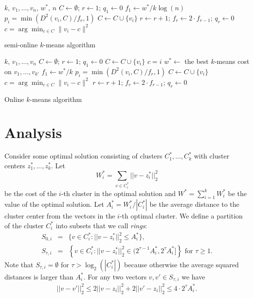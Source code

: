 \documentclass{article}
\def\tab{\hspace{5mm}}
\begin{document}
\begin{algorithm}
\begin{algorithmic}
 $k$, $v_1,\ldots,v_n$, $w^*$, $n$
\STATE $C \gets \emptyset$;\;\; $r \gets 1$;\;\; $q_1 \gets 0$ 
\STATE $f_1 \gets w^*/k\log(n)$
	 $p_i = \min(D^2(v_i, C)/f_r,1)$
	\STATE \tab $C \gets C \cup \{v_i\}$
		\STATE $r \gets r+1$;\;\;  $f_r \gets 2\cdot f_{r-1}$;\;\; $q_r \gets 0$
	\ENDIF
	 $c = \arg\min_{c \in C}\|v_i - c\|^2$
\ENDFOR
\caption{semi-online $k$-means algorithm}\label{alg3}
\end{algorithmic}
\end{algorithm}

\begin{algorithm}
\begin{algorithmic}
 $k$, $v_1,\ldots,v_n$
\STATE $C \gets \emptyset$;\;\; $r \gets 1$;\;\; $q_1 \gets 0$ 
	\STATE $C \gets C \cup \{v_i\}$
	 $c = i$
\ENDFOR
\STATE $w^{*} \gets$ the best $k$-means cost on $v_1,\ldots,v_{k'}$
\STATE $f_1 \gets  w^{*}/k$
	 $p_i = \min(D^2(v_i, C)/f_r,1)$
	\STATE \tab $C \gets C \cup \{v_i\}$
	 $c = \arg\min_{c \in C}\|v_i - c\|^2$
		\STATE $r \gets r+1$;\;\;  $f_r \gets 2\cdot f_{r-1}$;\;\; $q_r \gets 0$
	\ENDIF
\ENDFOR
\caption{Online $k$-means algorithm}\label{alg1}
\end{algorithmic}
\end{algorithm}

 



\section{Analysis}\label{analysis}
Consider some optimal solution consisting of clusters $C_1^*,\dots,C^*_k$ with cluster centers $z_1^*,\dots,z^*_k$. Let
$$W^*_i=\sum_{v\in C^*_i} ||v-z_i^*||_2^2$$
be the cost of the $i$-th cluster in the optimal solution and 
 $W^*=\sum_{i=1}^kW^*_i$ be the value of the optimal solution. 
Let $A^*_i=W^*_i/|C^*_i|$ be the average distance to the cluster center from the vectors in the $i$-th optimal cluster. 
We define a partition of the cluster $C_i^*$ into subsets that we call {\it rings}: 
\begin{eqnarray}
S_{0,i}&=&\{v\in C^*_i: ||v-z^*_i||^2_2\le A^*_i\},\\
S_{\tau,i}&=&\left\{v\in C^*_i: ||v-z^*_i||^2_2\in ( 2^{\tau-1}A^*_i,2^{\tau}A^*_i]\right\} \mbox{ for }\tau\ge 1.
\end{eqnarray}
Note that $S_{\tau,i}=\emptyset $  for $\tau > \log_2 (|C_i^*|)$ because otherwise the average squared distances is larger than $A^*_i$.
For any two vectors $v,v'\in S_{\tau,i}$  we have 
\begin{eqnarray}\label{triangleInequality}
||v-v'||^2_2\le 2 ||v-z_i||^2_2+2||v'-z_i||^2_2\le 4\cdot 2^{\tau}A^*_i.
\end{eqnarray}
\end{document}
